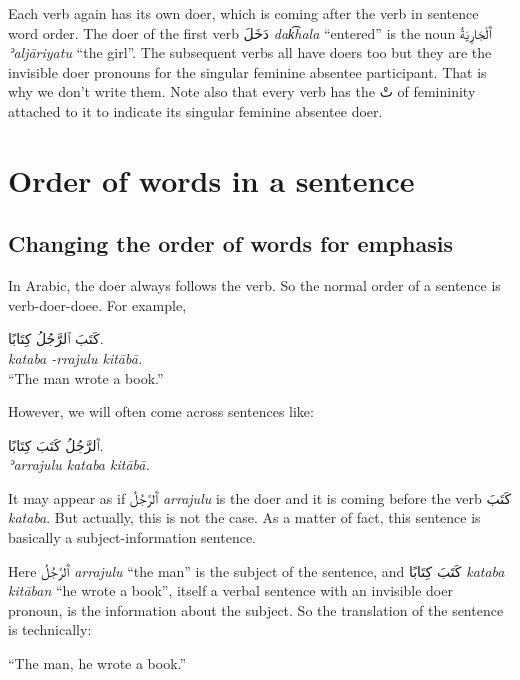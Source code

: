 \documentclass[
  10pt,
]{book}
\begin{document}
Each verb again has its own doer, which is coming after the verb in sentence word order. The doer of the first verb \foreignlanguage{arabic}{دَخَلَ} \emph{dak͡hala} \enquote{entered} is the noun
\foreignlanguage{arabic}{ٱَلْجَارِيَةُ} \emph{ʾaljāriyatu} \enquote{the girl}.
The subsequent verbs all have doers too but they are the invisible doer pronouns for the singular feminine absentee participant. That is why we don't write them. Note also that every verb has the \foreignlanguage{arabic}{تْ} of femininity attached to it to indicate its singular feminine absentee doer.

\section{Order of words in a sentence}\label{order-of-words-in-a-sentence}

\subsection{Changing the order of words for emphasis}\label{past-verbs-order-of-words}

In Arabic, the doer always follows the verb. So the normal order of a sentence is verb-doer-doee. For example,

\foreignlanguage{arabic}{کَتَبَ ٱلرَّجُلُ کِتَابًا.}\\
\emph{kataba -rrajulu kitābā.}\\
\enquote{The man wrote a book.}

However, we will often come across sentences like:

\foreignlanguage{arabic}{ٱَلرَّجُلُ کَتَبَ کِتَابًا.}\\
\emph{ʾarrajulu kataba kitābā.}

It may appear as if \foreignlanguage{arabic}{ٱَلرَّجُلُ} \emph{arrajulu} is the doer and it is coming before the verb \foreignlanguage{arabic}{کَتَبَ} \emph{kataba}. But actually, this is not the case. As a matter of fact, this sentence is basically a subject-information sentence.

Here \foreignlanguage{arabic}{ٱَلرَّجُلُ} \emph{arrajulu} \enquote{the man} is the subject of the sentence, and \foreignlanguage{arabic}{کَتَبَ کِتَابًا} \emph{kataba kitāban} \enquote{he wrote a book}, itself a verbal sentence with an invisible doer pronoun, is the information about the subject. So the translation of the sentence is technically:

\enquote{The man, he wrote a book.}
\end{document}
